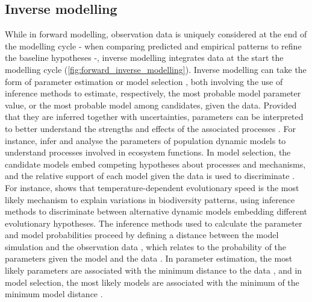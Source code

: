 \subsection{Inverse modelling}
While in forward modelling, observation data is uniquely considered at the end of the modelling cycle - when comparing predicted and empirical patterns to refine the baseline hypotheses -, inverse modelling integrates data at the start the modelling cycle \xxx (\cref{fig:forward_inverse_modelling}).
% 
% 
Inverse modelling can take the form of parameter estimation \citep{Schartau2017} or model selection \citep{Johnson2004}, both involving the use of inference methods to estimate, respectively, the most probable model parameter value, or the most probable model among candidates, given the data.
% 
% 
% 
% 
Provided that they are inferred together with uncertainties, parameters can be interpreted to better understand the strengths and effects of the associated processes \citep{Pontarp2019}. For instance, \citep{Higgins2010,Curtsdotter2019} infer and analyse the parameters of population dynamic models to understand processes involved in ecosystem functions.
%
In model selection, the candidate models embed competing hypotheses about processes and mechanisms, and the relative support of each model given the data is used to discriminate \citep{Johnson2004}. For instance, \citep{Skeels2022} shows that temperature-dependent evolutionary speed is the most likely mechanism to explain variations in biodiversity patterns, using inference methods to discriminate between alternative dynamic models embedding different evolutionary hypotheses.
% 
The inference methods used to calculate the parameter and model probabilities proceed by defining a distance between the model simulation and the observation data \xxx, which relates to the probability of the parameters given the model and the data \citep{Schartau2017}. In parameter estimation, the most likely parameters are associated with the minimum distance to the data \xxx, and in model selection, the most likely models are associated with the minimum of the minimum model distance \xxx.
